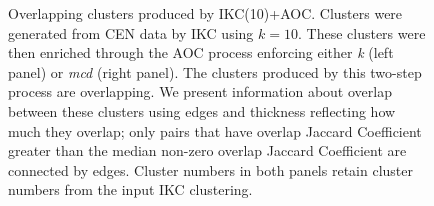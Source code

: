 \documentclass[12pt, oneside]{article}   	%
\begin{document}
\begin{figure}[H]
\begin{subfigure}[t]{0.48\textwidth}
    	\end{subfigure}
\caption{Overlapping clusters produced by IKC(10)+AOC.  Clusters were generated from CEN data by IKC using $k=10$. These clusters were then enriched through the AOC process enforcing either \emph{k} (left panel) or \emph{mcd} (right panel). 
The clusters produced  by this two-step process are overlapping. We present information about overlap between these clusters using edges and thickness reflecting how much they overlap; only pairs that have overlap Jaccard Coefficient greater  than the median  non-zero overlap Jaccard Coefficient are connected by edges. 
Cluster numbers in both panels retain cluster numbers from the input IKC clustering.}
\label{fig:overlapping}
\end{figure}
\end{document}
